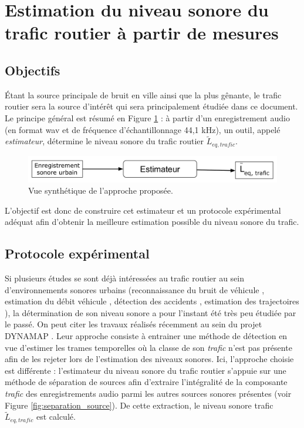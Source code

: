 \section{Estimation du niveau sonore du trafic routier à partir de mesures} \label{part:cachier_charges}

\subsection{Objectifs}
Étant la source principale de bruit en ville ainsi que la plus gênante, le trafic routier sera la source d'intérêt qui sera principalement étudiée dans ce document. Le principe général est résumé en Figure \ref{fig:estimateur0} : à partir d'un enregistrement audio (en format wav et de fréquence d'échantillonnage 44,1 kHz), un outil, appelé \textit{estimateur}, détermine le niveau sonore du trafic routier $\tilde{L}_{eq,trafic}$.

\begin{figure}[t]
\centering
\includegraphics[width=0.7\linewidth]{./figures/NMF/bloc_diagram_estimateur0.pdf}
\caption{Vue synthétique de l'approche proposée.}
\label{fig:estimateur0}
\end{figure}

L'objectif est donc de construire cet estimateur et un protocole expérimental adéquat afin d'obtenir la meilleure estimation possible du niveau sonore du trafic.

\subsection{Protocole expérimental}

Si plusieurs études se sont déjà intéressées au trafic routier au sein d'environnements sonores urbains (reconnaissance du bruit de véhicule \cite{defreville_automatic_2006}, estimation du débit véhicule \cite{torija2012using}, détection des accidents \cite{harlow2001automated}, estimation des trajectoires \cite{leiba2017large}), la détermination de son niveau sonore a pour l'instant été très peu étudiée par le passé. On peut citer les travaux réalisés récemment au sein du projet DYNAMAP \cite{socoro2017anomalous}. Leur approche consiste à entrainer une méthode de détection en vue d'estimer les trames temporelles où la classe de son \textit{trafic} n'est pas présente afin de les rejeter lors de l'estimation des niveaux sonores. Ici, l'approche choisie est différente : l'estimateur du niveau sonore du trafic routier s'appuie sur une méthode de séparation de sources afin d'extraire l'intégralité de la composante \textit{trafic} des enregistrements audio parmi les autres sources sonores présentes (voir Figure \ref{fig:separation_source}). De cette extraction, le niveau sonore trafic $\tilde{L}_{eq,trafic}$ est calculé.

